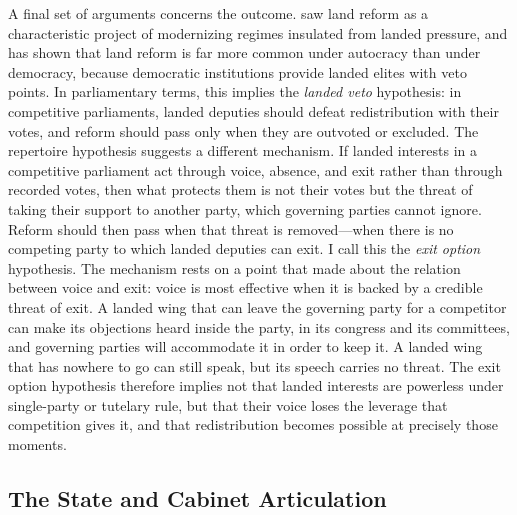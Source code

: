 \documentclass[12pt]{article}
\begin{document}
A final set of arguments concerns the outcome. \citet{huntington1968} saw land reform as a characteristic project of modernizing regimes insulated from landed pressure, and \citet{albertus2015} has shown that land reform is far more common under autocracy than under democracy, because democratic institutions provide landed elites with veto points. In parliamentary terms, this implies the \textit{landed veto} hypothesis: in competitive parliaments, landed deputies should defeat redistribution with their votes, and reform should pass only when they are outvoted or excluded. The repertoire hypothesis suggests a different mechanism. If landed interests in a competitive parliament act through voice, absence, and exit rather than through recorded votes, then what protects them is not their votes but the threat of taking their support to another party, which governing parties cannot ignore. Reform should then pass when that threat is removed---when there is no competing party to which landed deputies can exit. I call this the \textit{exit option} hypothesis. The mechanism rests on a point that \citet{hirschman1970} made about the relation between voice and exit: voice is most effective when it is backed by a credible threat of exit. A landed wing that can leave the governing party for a competitor can make its objections heard inside the party, in its congress and its committees, and governing parties will accommodate it in order to keep it. A landed wing that has nowhere to go can still speak, but its speech carries no threat. The exit option hypothesis therefore implies not that landed interests are powerless under single-party or tutelary rule, but that their voice loses the leverage that competition gives it, and that redistribution becomes possible at precisely those moments.

\subsection*{The State and Cabinet Articulation}
\end{document}
